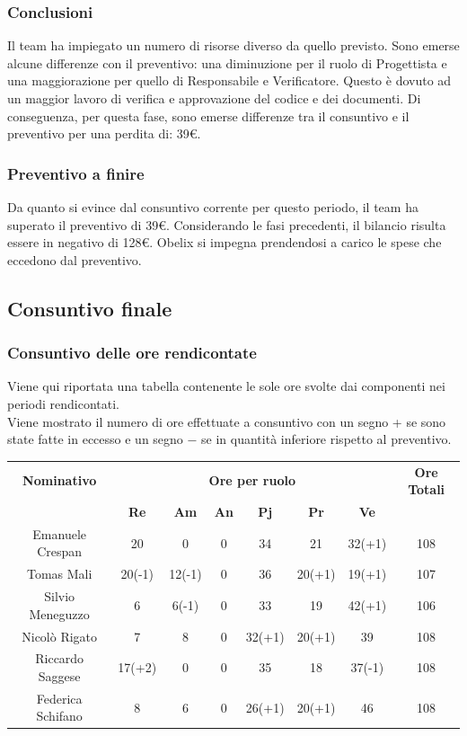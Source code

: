 \subsubsection{Conclusioni}

Il team ha impiegato un numero di risorse diverso da quello previsto. Sono emerse alcune differenze con il preventivo: una diminuzione per il ruolo di Progettista e una maggiorazione per quello di Responsabile e Verificatore. Questo è dovuto ad un maggior lavoro di verifica e approvazione del codice e dei documenti. Di conseguenza, per questa fase, sono emerse differenze tra il consuntivo e il preventivo per una perdita di: 39€.

\subsubsection{Preventivo a finire}
Da quanto si evince dal consuntivo corrente per questo periodo, il team ha superato il preventivo
di 39€. Considerando le fasi precedenti, il bilancio risulta essere in negativo di 128€. Obelix si impegna prendendosi a carico le spese che eccedono dal preventivo. 

\newpage
\subsection{Consuntivo finale}
\subsubsection{Consuntivo delle ore rendicontate}
Viene qui riportata una tabella contenente le sole ore svolte dai componenti nei periodi rendicontati.\\
Viene mostrato il numero di ore effettuate a consuntivo con un segno + se sono state fatte in eccesso e un segno − se in quantità inferiore rispetto al preventivo.

\begin{center}
	\centering
	\begin{tabular} {|c|c|c|c|c|c|c|c|}
		\hline
		\textbf{Nominativo} & \multicolumn{6}{|c|}{\textbf{Ore per ruolo}} & \textbf{Ore Totali} \\
		& \textbf{Re} & \textbf{Am} & \textbf{An} & \textbf{Pj} & \textbf{Pr} & \textbf{Ve} & \\
		\hline
		Emanuele Crespan &20 &0 &0 &34 &21 &32(+1) &108\\
		\hline
		Tomas Mali &20(-1) &12(-1) &0 &36 &20(+1) &19(+1) &107\\
		\hline
		Silvio Meneguzzo &6 &6(-1) &0 &33 &19 &42(+1) &106\\
		\hline
		Nicolò Rigato &7 &8 &0 &32(+1) &20(+1) &39 &108\\
		\hline
		Riccardo Saggese &17(+2) &0 &0 &35 &18 &37(-1) &108\\
		\hline
		Federica Schifano &8 &6 &0 &26(+1) &20(+1) &46 &108\\
		\hline
	\end{tabular}
\end{center}

